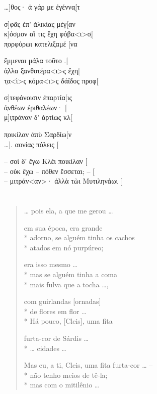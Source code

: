 {\begin{gkverse}
\ldots{}]θος· ἀ γάρ με ἐγέννα̣[τ

σ]φᾶς ἐπ’ ἀλικίας μέγ[αν\\
κ]όσμον αἴ τις ἔχη φόβα<ι>σ̣[\\
π̣ορφύρωι κατελιξαμέ [να

ἔ̣μμεναι μά̣λα τοῦτο .[\\
ἀ̣λλα ξανθοτέρα<ι>ς ἔχη[\\
τ̣α<ὶ>ς κόμα<ι>ς δάϊδος προφ[

σ]τεφάνοισιν ἐπαρτία[ις\\
ἀ̣νθέων ἐριθαλέων· [ \\
μ]ι̣τράναν δ’ ἀρτίως κλ[

π̣οικίλαν ἀπὺ Σαρδίω[ν\\
\ldots{}]. αονίας πόλ{ε}ις [

\hspace*{16mm}

-- σοὶ δ’ ἔγω Κλέι ποικίλαν [\\
-- οὐκ ἔχω -- πόθεν ἔσσεται; -- [\\
-- μιτράν<αν>· ἀλλὰ τὼι Μυτιληνάωι [
\end{gkverse}

\chapter*{}
\section*{}

\begin{verse}
\ldots{} pois ela, a que me gerou \ldots{}


em sua época, era grande \\*
adorno, se alguém tinha os cachos\\*
atados em nó purpúreo;


era isso mesmo \ldots{} \\*
mas se alguém tinha a coma\\*
mais fulva que a tocha \ldots{},

com guirlandas [ornadas]\\*
de flores em flor \ldots{}\\*
Há pouco, [Cleis], uma fita

furta-cor de Sárdis \ldots{}\\*
\ldots{} cidades \ldots{}

Mas eu, a ti, Cleis, uma fita furta-cor \ldots{} --\\*
não tenho meios de tê-la; \\*
mas com o mitilênio \ldots{}


\end{verse}}
